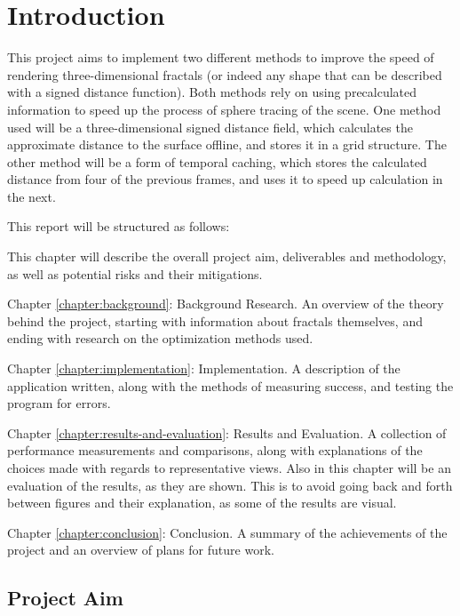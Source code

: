 \chapter{Introduction}
\label{chapter:introduction}

This project aims to implement two different methods to improve the speed of rendering three-dimensional fractals (or indeed any shape that can be described with a signed distance function). Both methods rely on using precalculated information to speed up the process of sphere tracing of the scene. One method used will be a three-dimensional signed distance field, which calculates the approximate distance to the surface offline, and stores it in a grid structure. The other method will be a form of temporal caching, which stores the calculated distance from four of the previous frames, and uses it to speed up calculation in the next.\newline

This report will be structured as follows:\newline

This chapter will describe the overall project aim, deliverables and methodology, as well as potential risks and their mitigations.\newline

Chapter \ref{chapter:background}: Background Research. An overview of the theory behind the project, starting with information about fractals themselves, and ending with research on the optimization methods used.\newline

Chapter \ref{chapter:implementation}: Implementation. A description of the application written, along with the methods of measuring success, and testing the program for errors.\newline

Chapter \ref{chapter:results-and-evaluation}: Results and Evaluation. A collection of performance measurements and comparisons, along with explanations of the choices made with regards to representative views. Also in this chapter will be an evaluation of the results, as they are shown. This is to avoid going back and forth between figures and their explanation, as some of the results are visual.\newline

Chapter \ref{chapter:conclusion}: Conclusion. A summary of the achievements of the project and an overview of plans for future work.

\section{Project Aim}

